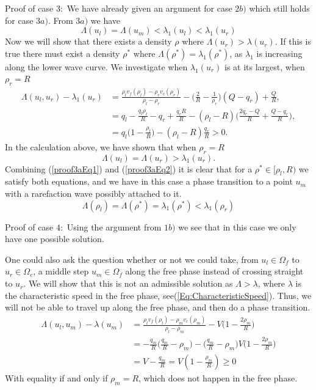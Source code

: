\documentclass[10pt]{article}
\numberwithin{equation}{section}
\begin{document}
Proof of case $3:$ \newline
We have already given an argument for case $2b)$ which still holds for case $3a)$. From $3a)$ we have 
\begin{equation}
    \Lambda(u_l) = \Lambda(u_m) < \lambda_1(u_l) < \lambda_1(u_r)
    \label{proof3aEq1}
\end{equation}
Now we will show that there exists a density $\rho$ where $\Lambda(u_r) > \lambda(u_r)$. If this is true there must exist a density $\rho^*$ where $\Lambda(\rho^*) = \lambda_1(\rho^*)$, as $\lambda_1$ is increasing along the lower wave curve. We investigate when $\lambda_1(u_r)$ is at its largest, when $\rho_r = R$
\begin{align*}
    \Lambda(u_l, u_r) - \lambda_1(u_r) &= \frac{\rho_l v_f(\rho_l) - \rho_r v_c(\rho_r)}{\rho_l - \rho_r} - \bigg ( \frac{2}{R} - \frac{1}{\rho_r}\bigg) (Q-q_r) + \frac{Q}{R}, \\
    &= q_l - \frac{q_l \rho_l}{R} - q_r + \frac{q_r R}{R} - (\rho_l - R) \bigg( \frac{2q_r - Q}{R} + \frac{Q-q_r}{R}\bigg), \\
    &= q_l\bigg( 1 - \frac{\rho_l}{R} \bigg) - (\rho_l - R)\frac{q_r}{R} > 0.
\end{align*}
In the calculation above, we have shown that when $\rho_r = R$ 
\begin{equation}
    \Lambda(u_l) = \Lambda(u_r) > \lambda_1(u_r). 
     \label{proof3aEq2}
\end{equation}
Combining (\ref{proof3aEq1}) and (\ref{proof3aEq2}) it is clear that for a $\rho^* \in [\rho_l, R)$ we satisfy both equations, and we have in this case a phase transition to a point $u_m$ with a rarefaction wave possibly attached to it.
\begin{equation*}
    \Lambda(\rho_l) = \Lambda(\rho^*) = \lambda_1(\rho^*) < \lambda_1(\rho_r)
\end{equation*}

Proof of case $4:$ \newline
Using the argument from $1b)$ we see that in this case we only have one possible solution.

 One could also ask the question whether or not we could take, from $u_l \in \Omega_f$ to $u_r \in \Omega_c$, a middle step $u_m \in \Omega_f$ along the free phase instead of crossing straight to $u_r$. We will show that this is not an admissible solution as $\Lambda > \lambda$, where $\lambda$ is the characteristic speed in the free phase, see(\ref{Eq:CharacteristicSpeed}). Thus, we will not be able to travel up along the free phase, and then do a phase transition. 
 \begin{align*}
      \Lambda(u_l,u_m) - \lambda(u_m) &= \frac{\rho_l v_f(\rho_l) - \rho_m v_c(\rho_m)}{\rho_l - \rho_m} - V \bigg(1-  \frac{2\rho_m}{R} \bigg) \\
      &= - \frac{q_m}{R} \bigg( \frac{q_m}{R} - \rho_m \bigg) - \bigg( \frac{q_m}{R} - \rho_m \bigg)V \bigg(1- \frac{2\rho_m}{R} \bigg) \\
      &= V - \frac{q_m}{R} = V( 1- \frac{\rho_m}{R}) \geq 0 
 \end{align*}
With equality if and only if $\rho_m = R$, which does not happen in the free phase. 
\end{document}
